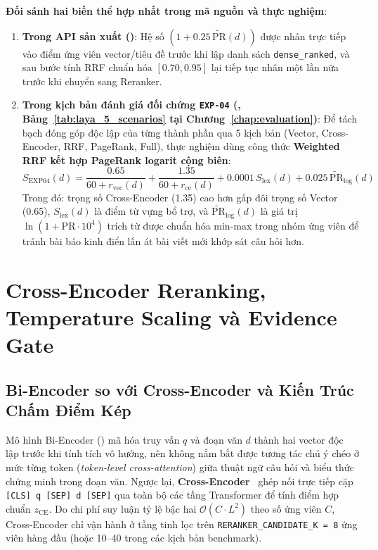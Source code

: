\textbf{Đối sánh hai biến thể hợp nhất trong mã nguồn và thực nghiệm}:
\begin{enumerate}[label=\textbf{\arabic*.}]
  \item \textbf{Trong API sản xuất ()}: Hệ số $(1 + 0.25\,\widetilde{\mathrm{PR}}(d))$ được nhân trực tiếp vào điểm ứng viên vector/tiêu đề trước khi lập danh sách \texttt{dense\_ranked}, và sau bước tính RRF chuẩn hóa $[0.70, 0.95]$ lại tiếp tục nhân một lần nữa trước khi chuyển sang Reranker.
  \item \textbf{Trong kịch bản đánh giá đối chứng \texttt{EXP-04} (, Bảng~\ref{tab:laya_5_scenarios} tại Chương~\ref{chap:evaluation})}: Để tách bạch đóng góp độc lập của từng thành phần qua 5 kịch bản (Vector, Cross-Encoder, RRF, PageRank, Full), thực nghiệm dùng công thức \textbf{Weighted RRF kết hợp PageRank logarit cộng biên}:
  \begin{equation}
    S_{\text{EXP04}}(d) = \frac{0.65}{60 + r_{\text{vec}}(d)} + \frac{1.35}{60 + r_{\text{ce}}(d)} + 0.0001\,S_{\text{lex}}(d) + 0.025\,\widetilde{\mathrm{PR}}_{\log}(d)
    \label{eq:ch4_exp04_rrf}
  \end{equation}
  Trong đó: trọng số Cross-Encoder (1.35) cao hơn gấp đôi trọng số Vector (0.65), $S_{\text{lex}}(d)$ là điểm từ vựng bổ trợ, và $\widetilde{\mathrm{PR}}_{\log}(d)$ là giá trị $\ln(1 + \mathrm{PR} \cdot 10^4)$ trích từ  được chuẩn hóa min-max trong nhóm ứng viên để tránh bài báo kinh điển lấn át bài viết mới khớp sát câu hỏi hơn.
\end{enumerate}

\section{Cross-Encoder Reranking, Temperature Scaling và Evidence Gate}
\label{sec:ch4_reranking}

\subsection{Bi-Encoder so với Cross-Encoder và Kiến Trúc Chấm Điểm Kép}
\label{sec:ch4_ce_arch}

Mô hình Bi-Encoder () mã hóa truy vấn $q$ và đoạn văn $d$ thành hai vector độc lập trước khi tính tích vô hướng, nên không nắm bắt được tương tác chú ý chéo ở mức từng token (\textit{token-level cross-attention}) giữa thuật ngữ câu hỏi và biểu thức chứng minh trong đoạn văn. Ngược lại, \textbf{Cross-Encoder}~\cite{nogueira2019passage} ghép nối trực tiếp cặp \texttt{[CLS] q [SEP] d [SEP]} qua toàn bộ các tầng Transformer để tính điểm hợp chuẩn $z_{\text{CE}}$. Do chi phí suy luận tỷ lệ bậc hai $\mathcal{O}(C \cdot L^2)$ theo số ứng viên $C$, Cross-Encoder chỉ vận hành ở tầng tinh lọc trên \texttt{RERANKER\_CANDIDATE\_K = 8} ứng viên hàng đầu (hoặc 10--40 trong các kịch bản benchmark).

